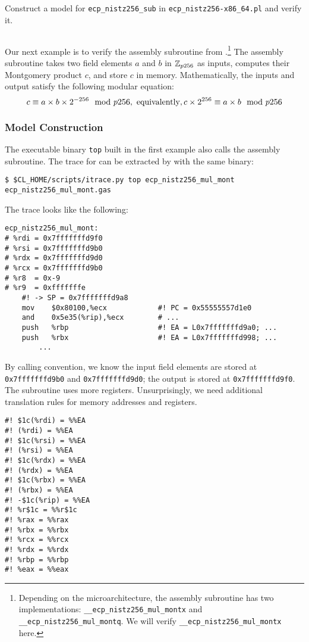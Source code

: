 \documentclass{amsproc}
\begin{document}
\exercise Construct a model for \texttt{ecp\_nistz256\_sub} in 
\texttt{ecp\_nistz256-x86\_64.pl} and verify it.

\subsection{\nistzmul}

Our next example is to verify the assembly subroutine \nistzmul from
\openssl.\footnote{Depending on the 
\xeightysix microarchitecture, the assembly subroutine \nistzmul
has two implementations: \texttt{\_\_ecp\_nistz256\_mul\_montx} and
\texttt{\_\_ecp\_nistz256\_mul\_montq}. We will verify
\texttt{\_\_ecp\_nistz256\_mul\_montx} here.} The assembly subroutine
takes two field elements $a$ and $b$ in $\mathbb{Z}_{p256}$ as inputs,
computes their Montgomery product $c$, and store $c$ in
memory. Mathematically, the inputs and output satisfy the following
modular equation:
\[
c \equiv a \times b \times 2^{-256} \mod p256, \textmd{
  equivalently}, 
c \times 2^{256} \equiv a \times b \mod p256
\]

\subsubsection{Model Construction}

The executable binary
\texttt{top} built in the first example also calls the assembly
subroutine. The trace for \nistzmul can be extracted by \itrace with
the same binary:
\begin{verbatim}
$ $CL_HOME/scripts/itrace.py top ecp_nistz256_mul_mont ecp_nistz256_mul_mont.gas
\end{verbatim}

The trace \nistzmulgas looks like the following:
\begin{verbatim}
ecp_nistz256_mul_mont:
# %rdi = 0x7fffffffd9f0
# %rsi = 0x7fffffffd9b0
# %rdx = 0x7fffffffd9d0
# %rcx = 0x7fffffffd9b0
# %r8  = 0x-9
# %r9  = 0xfffffffe
	#! -> SP = 0x7fffffffd9a8
	mov    $0x80100,%ecx            #! PC = 0x55555557d1e0
	and    0x5e35(%rip),%ecx        # ...
	push   %rbp                     #! EA = L0x7fffffffd9a0; ...
	push   %rbx                     #! EA = L0x7fffffffd998; ...
        ...
\end{verbatim}
By calling convention, we know the input field elements are stored at
\texttt{0x7fffffffd9b0} and \texttt{0x7fffffffd9d0}; the output is
stored at \texttt{0x7fffffffd9f0}. The subroutine uses more
registers. Unsurprisingly, we need additional translation rules for
memory addresses and registers.
\begin{verbatim}
#! $1c(%rdi) = %%EA
#! (%rdi) = %%EA
#! $1c(%rsi) = %%EA
#! (%rsi) = %%EA
#! $1c(%rdx) = %%EA
#! (%rdx) = %%EA
#! $1c(%rbx) = %%EA
#! (%rbx) = %%EA
#! -$1c(%rip) = %%EA
#! %r$1c = %%r$1c
#! %rax = %%rax
#! %rbx = %%rbx
#! %rcx = %%rcx
#! %rdx = %%rdx
#! %rbp = %%rbp
#! %eax = %%eax
\end{verbatim}
\end{document}
